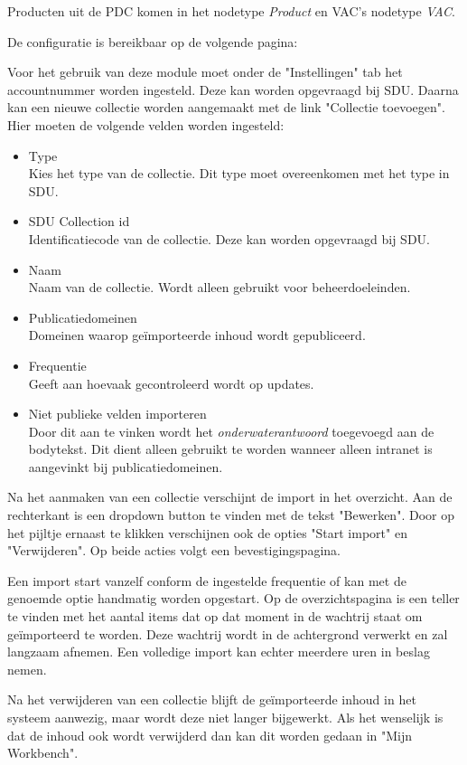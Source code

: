 Producten uit de PDC komen in het nodetype \emph{Product} en VAC's nodetype \emph{VAC}.

De configuratie is bereikbaar op de volgende pagina: \\

Voor het gebruik van deze module moet onder de "Instellingen" tab het accountnummer worden ingesteld. Deze kan worden opgevraagd bij SDU. Daarna kan een nieuwe collectie worden aangemaakt met de link "Collectie toevoegen". Hier moeten de volgende velden worden ingesteld:
\begin{itemize}
\item Type \\ Kies het type van de collectie. Dit type moet overeenkomen met het type in SDU.
\item SDU Collection id \\ Identificatiecode van de collectie. Deze kan worden opgevraagd bij SDU.
\item Naam \\ Naam van de collectie. Wordt alleen gebruikt voor beheerdoeleinden.
\item Publicatiedomeinen \\ Domeinen waarop ge\"{i}mporteerde inhoud wordt gepubliceerd.
\item Frequentie \\ Geeft aan hoevaak gecontroleerd wordt op updates.
\item Niet publieke velden importeren \\ Door dit aan te vinken wordt het \emph{onderwaterantwoord} toegevoegd aan de bodytekst. Dit dient alleen gebruikt te worden wanneer alleen intranet is aangevinkt bij publicatiedomeinen.
\end{itemize}
Na het aanmaken van een collectie verschijnt de import in het overzicht. Aan de rechterkant is een dropdown button te vinden met de tekst "Bewerken". Door op het pijltje ernaast te klikken verschijnen ook de opties "Start import" en "Verwijderen". Op beide acties volgt een bevestigingspagina.

Een import start vanzelf conform de ingestelde frequentie of kan met de genoemde optie handmatig worden opgestart. Op de overzichtspagina is een teller te vinden met het aantal items dat op dat moment in de wachtrij staat om ge\"{i}mporteerd te worden. Deze wachtrij wordt in de achtergrond verwerkt en zal langzaam afnemen. Een volledige import kan echter meerdere uren in beslag nemen.

Na het verwijderen van een collectie blijft de ge\"{i}mporteerde inhoud in het systeem aanwezig, maar wordt deze niet langer bijgewerkt. Als het wenselijk is dat de inhoud ook wordt verwijderd dan kan dit worden gedaan in "Mijn Workbench".

